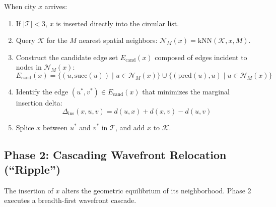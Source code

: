 \documentclass[11pt,a4paper]{article}
\theoremstyle{definition}
\begin{document}
When city $x$ arrives:
\begin{enumerate}
    \item If $|\mathcal{T}| < 3$, $x$ is inserted directly into the circular list.
    \item Query $\mathcal{K}$ for the $M$ nearest spatial neighbors: $\mathcal{N}_M(x) = \text{kNN}(\mathcal{K}, x, M)$.
    \item Construct the candidate edge set $E_{\text{cand}}(x)$ composed of edges incident to nodes in $\mathcal{N}_M(x)$:
    \begin{equation}
    E_{\text{cand}}(x) = \{(u, \text{succ}(u)) \mid u \in \mathcal{N}_M(x)\} \cup \{(\text{pred}(u), u) \mid u \in \mathcal{N}_M(x)\}
    \end{equation}
    \item Identify the edge $(u^*, v^*) \in E_{\text{cand}}(x)$ that minimizes the marginal insertion delta:
    \begin{equation}
    \Delta_{\text{ins}}(x, u, v) = d(u, x) + d(x, v) - d(u, v)
    \end{equation}
    \item Splice $x$ between $u^*$ and $v^*$ in $\mathcal{T}$, and add $x$ to $\mathcal{K}$.
\end{enumerate}

\subsection{Phase 2: Cascading Wavefront Relocation (``Ripple'')}

The insertion of $x$ alters the geometric equilibrium of its neighborhood. Phase 2 executes a breadth-first wavefront cascade.
\end{document}
